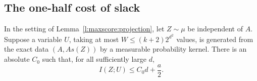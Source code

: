 \subsection{The one-half cost of slack}

\begin{lemma}\label{l:maxscore:block}
In the setting of Lemma~\ref{l:maxscore:projection}, let \(Z\sim\mu\)
be independent of \(A\).  Suppose a variable \(U\), taking at most
\(W\le(k+2)2^{d^2}\) values, is generated from the exact data
\((A,As(Z))\) by a measurable probability kernel.  There is an
absolute \(C_0\) such that, for all sufficiently large \(d\),
\begin{equation}\label{l:maxscore:block-information}
 I(Z;U)\le C_0d+\frac a2.
\end{equation}
\end{lemma}

